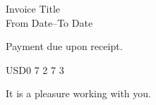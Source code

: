 \documentclass[english]{letter}
\begin{document}
\address{Your Name\\
Address 1\\
Address 2}


\signature{Your Name}

Invoice Title\\
From Date--To Date

\opening{Payment due upon receipt.}

\begin{invoice}{USD}{0}
    {7} {2}
    {7} {3}
\end{invoice}

\closing{It is a pleasure working with you.}
\end{document}

